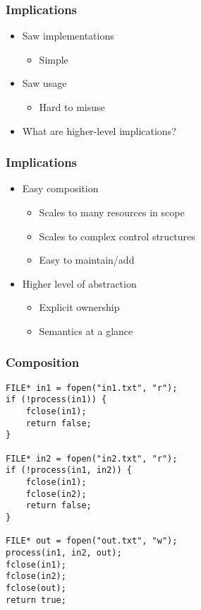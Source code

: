 \begin{frame}
    \frametitle{Implications}
    \begin{itemize}
        \item Saw implementations
            \begin{itemize}
                \item Simple
            \end{itemize}
        \item Saw usage
            \begin{itemize}
                \item Hard to misuse
            \end{itemize}
        \item What are higher-level implications?
    \end{itemize}
\end{frame}

\begin{frame}
    \frametitle{Implications}
    \begin{itemize}
        \item Easy composition
            \begin{itemize}
                \item Scales to many resources in scope
                \item Scales to complex control structures
                \item Easy to maintain/add
            \end{itemize}
        \item Higher level of abstraction
            \begin{itemize}
                \item Explicit ownership
                \item Semantics at a glance
            \end{itemize}
    \end{itemize}
\end{frame}

\begin{frame}[fragile]
    \frametitle{Composition}
    \begin{lstlisting}[basicstyle=\scriptsize\ttfamily\color{codefg},title=Without RAII]
FILE* in1 = fopen("in1.txt", "r");
if (!process(in1)) {
    fclose(in1);
    return false;
}

FILE* in2 = fopen("in2.txt", "r");
if (!process(in1, in2)) {
    fclose(in1);
    fclose(in2);
    return false;
}

FILE* out = fopen("out.txt", "w");
process(in1, in2, out);
fclose(in1);
fclose(in2);
fclose(out);
return true;
    \end{lstlisting}
\end{frame}

